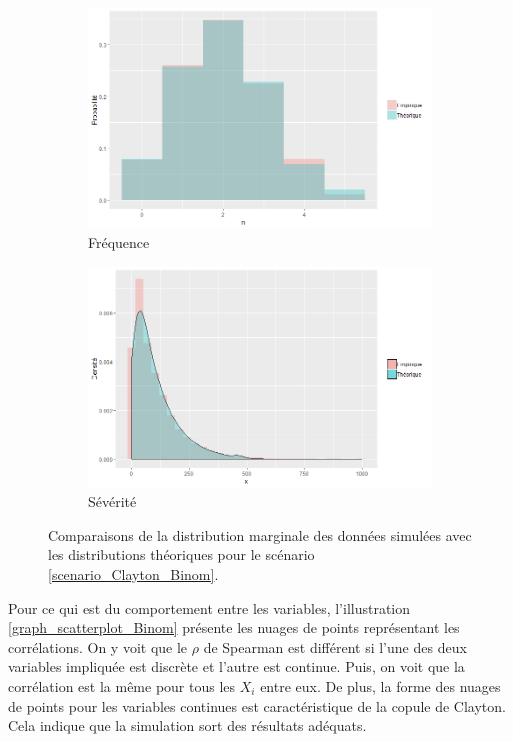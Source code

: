 \documentclass{article}
\begin{document}
	\begin{figure}[H]
	\begin{subfigure}[l]{0.5\textwidth}
		\includegraphics[width=\textwidth]{Graph/Clayton_Binom_N.png}
		\caption{Fréquence}
	\end{subfigure}
	\begin{subfigure}[r]{0.5\textwidth}
		\includegraphics[width=\textwidth]{Graph/Clayton_Binom_X.png}
		\caption{Sévérité}
	\end{subfigure}
	\caption{Comparaisons de la distribution marginale des données simulées avec les distributions théoriques pour le scénario \ref{scenario_Clayton_Binom}.}
	\label{graph_densite_Binom}
	\end{figure}
	
	Pour ce qui est du comportement entre les variables, l'illustration \ref{graph_scatterplot_Binom} présente les nuages de points représentant les corrélations. On y voit que le $\rho$ de Spearman est différent si l'une des deux variables impliquée est discrète et l'autre est continue. Puis, on voit que la corrélation est la même pour tous les $X_i$ entre eux. De plus, la forme des nuages de points pour les variables continues est caractéristique de la copule de Clayton. Cela indique que la simulation sort des résultats adéquats.\\
	
\end{document}
